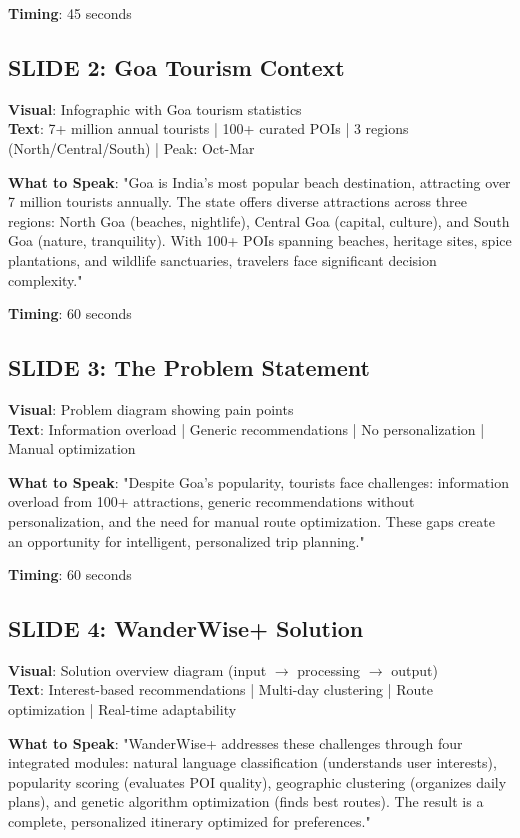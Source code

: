 \documentclass[12pt]{article}
\begin{document}
\textbf{Timing}: 45 seconds

\subsection{SLIDE 2: Goa Tourism Context}
\textbf{Visual}: Infographic with Goa tourism statistics \\
\textbf{Text}: 7+ million annual tourists | 100+ curated POIs | 3 regions (North/Central/South) | Peak: Oct-Mar

\textbf{What to Speak}:
"Goa is India's most popular beach destination, attracting over 7 million tourists annually. The state offers diverse attractions across three regions: North Goa (beaches, nightlife), Central Goa (capital, culture), and South Goa (nature, tranquility). With 100+ POIs spanning beaches, heritage sites, spice plantations, and wildlife sanctuaries, travelers face significant decision complexity."

\textbf{Timing}: 60 seconds

\subsection{SLIDE 3: The Problem Statement}
\textbf{Visual}: Problem diagram showing pain points \\
\textbf{Text}: Information overload | Generic recommendations | No personalization | Manual optimization

\textbf{What to Speak}:
"Despite Goa's popularity, tourists face challenges: information overload from 100+ attractions, generic recommendations without personalization, and the need for manual route optimization. These gaps create an opportunity for intelligent, personalized trip planning."

\textbf{Timing}: 60 seconds

\subsection{SLIDE 4: WanderWise+ Solution}
\textbf{Visual}: Solution overview diagram (input $\rightarrow$ processing $\rightarrow$ output) \\
\textbf{Text}: Interest-based recommendations | Multi-day clustering | Route optimization | Real-time adaptability

\textbf{What to Speak}:
"WanderWise+ addresses these challenges through four integrated modules: natural language classification (understands user interests), popularity scoring (evaluates POI quality), geographic clustering (organizes daily plans), and genetic algorithm optimization (finds best routes). The result is a complete, personalized itinerary optimized for preferences."
\end{document}
